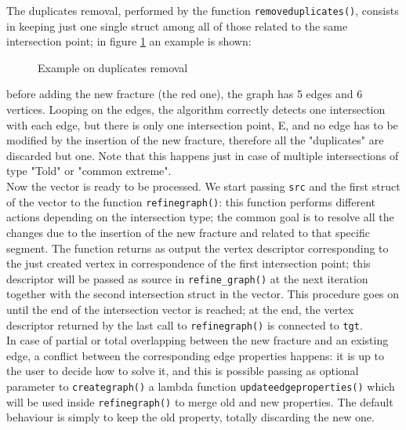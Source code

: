 \documentclass[10pt]{article} %
\begin{document}
	The duplicates removal, performed by the function \texttt{remove\textunderscore duplicates()}, consists in keeping just one single struct among all of those related to the same intersection point; in figure \ref{fig:rem_dupl} an example is shown: 
	\begin{figure}
		\centering 
		\caption{Example on duplicates removal}
		\label{fig:rem_dupl}
	\end{figure}
	before adding the new fracture (the red one), the graph has 5 edges and 6 vertices. Looping on the edges, the algorithm correctly detects one intersection with each edge, but there is only one intersection point, E, and no edge has to be modified by the insertion of the new fracture, therefore all the "duplicates" are discarded but one. Note that this happens just in case of multiple intersections of type "Told" or "common extreme". \\
	Now the vector is ready to be processed. We start passing  \texttt{src} and the first struct of the vector to the function \texttt{refine\textunderscore graph()}: this function performs different actions depending on the intersection type; the common goal is to resolve all the changes due to the insertion of the new fracture and related to that specific segment. The function returns as output the vertex descriptor corresponding to the just created vertex in correspondence of the first intersection point; this descriptor will be passed as source in \texttt{refine\_graph()} at the next iteration together with the second intersection struct in the vector. This procedure goes on until the end of the intersection vector is reached; at the end, the vertex descriptor returned by the last call to \texttt{refine\textunderscore graph()} is connected to \texttt{tgt}. \\
	In case of partial or total overlapping between the new fracture and an existing edge, a conflict between the corresponding edge properties happens: it is up to the user to decide how to solve it, and this is possible passing as optional parameter to \texttt{create\textunderscore graph()} a lambda function \texttt{update\textunderscore edge\textunderscore properties()} which will be used inside \texttt{refine\textunderscore graph()} to merge old and new properties. The default behaviour is simply to keep the old property, totally discarding the new one.
	
\end{document}
